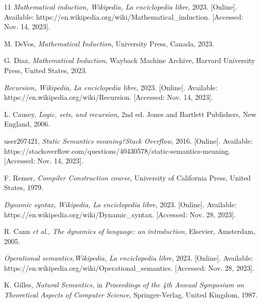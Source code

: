 \begin{thebibliography}{11}
    \label{sec:91}
    \hypertarget{91}{}
    \textit{Mathematical induction, }\textit{Wikipedia, La enciclopedia libre}, 2023. [Online]. Available: https://en.wikipedia.org/wiki/Mathematical\_induction. [Accessed: Nov. 14, 2023].

    \label{sec:92}
    \hypertarget{92}{}
    M. DeVos, \textit{Mathematical Induction}, University Press, Canada, 2023.

    \label{sec:93}
    \hypertarget{93}{}
    G. Diaz, \textit{Mathematical Induction}, Wayback Machine Archive, Harvard University Press, United States, 2023.

    \label{sec:94}
    \hypertarget{94}{}
    \textit{Recursion, }\textit{Wikipedia, La enciclopedia libre}, 2023. [Online]. Available: https://en.wikipedia.org/wiki/Recursion. [Accessed: Nov. 14, 2023].

    \label{sec:95}
    \hypertarget{95}{}
    L. Causey, \textit{Logic, sets, and recursion}, 2nd ed. Jones and Bartlett Publishers, New England, 2006.

    \label{sec:96}
    \hypertarget{96}{}
    user207421, \textit{Static Semantics meaning?}\textit{Stack Overflow}, 2016. [Online]. Available: https://stackoverflow.com/questions/40430578/static-semantics-meaning. [Accessed: Nov. 14, 2023].

    \label{sec:97}
    \hypertarget{97}{}
    F. Remer, \textit{Compiler Construction course, } University of California Press, United States, 1979.

    \label{sec:98}
    \hypertarget{98}{}
    \textit{Dynamic syntax, }\textit{Wikipedia, La enciclopedia libre}, 2023. [Online]. Available: https://en.wikipedia.org/wiki/Dynamic\_syntax. [Accessed: Nov. 28, 2023].

    \label{sec:99}
    \hypertarget{99}{}
    R. Cann \textit{et al.}, \textit{The dynamics of language: an introduction}, Elsevier, Amsterdam, 2005.

    \label{sec:100}
    \hypertarget{100}{}
    \textit{Operational semantics,}\textit{Wikipedia, La enciclopedia libre}, 2023. [Online]. Available: https://en.wikipedia.org/wiki/Operational\_semantics. [Accessed: Nov. 28, 2023].

    \label{sec:101}
    \hypertarget{101}{}
    K. Gilles, \textit{Natural Semantics, }in \textit{Proceedings of the 4th Annual Symposium on Theoretical Aspects of Computer Science}, Springer-Verlag, United Kingdom, 1987.


\end{thebibliography}

